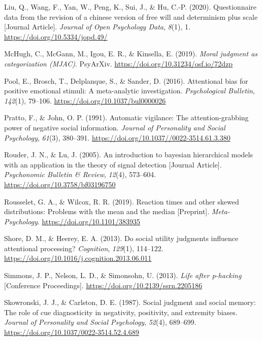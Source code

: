 \documentclass[
  man]{apa6}
\newlength{\cslhangindent}
\newlength{\cslentryspacingunit} %
\newenvironment{CSLReferences}[2] %
 {%
  \setlength{\parindent}{0pt}
  \ifodd #1
  \let\oldpar\par
  \def\par{\hangindent=\cslhangindent\oldpar}
  \fi
  \setlength{\parskip}{#2\cslentryspacingunit}
 }%
 {}
\begin{document}
\begin{CSLReferences}{1}{0}
\leavevmode{}%
Liu, Q., Wang, F., Yan, W., Peng, K., Sui, J., \& Hu, C.-P. (2020). Questionnaire data from the revision of a chinese version of free will and determinism plus scale {[}Journal Article{]}. \emph{Journal of Open Psychology Data}, \emph{8}(1), 1. \url{https://doi.org/10.5334/jopd.49/}

\leavevmode{}%
McHugh, C., McGann, M., Igou, E. R., \& Kinsella, E. (2019). \emph{Moral judgment as categorization ({MJAC})}. {PsyArXiv}. \url{https://doi.org/10.31234/osf.io/72dzp}

\leavevmode{}%
Pool, E., Brosch, T., Delplanque, S., \& Sander, D. (2016). Attentional bias for positive emotional stimuli: A meta-analytic investigation. \emph{Psychological Bulletin}, \emph{142}(1), 79--106. \url{https://doi.org/10.1037/bul0000026}

\leavevmode{}%
Pratto, F., \& John, O. P. (1991). Automatic vigilance: The attention-grabbing power of negative social information. \emph{Journal of Personality and Social Psychology}, \emph{61}(3), 380--391. \url{https://doi.org/10.1037//0022-3514.61.3.380}

\leavevmode{}%
Rouder, J. N., \& Lu, J. (2005). An introduction to bayesian hierarchical models with an application in the theory of signal detection {[}Journal Article{]}. \emph{Psychonomic Bulletin \& Review}, \emph{12}(4), 573--604. \url{https://doi.org/10.3758/bf03196750}

\leavevmode{}%
Rousselet, G. A., \& Wilcox, R. R. (2019). Reaction times and other skewed distributions: Problems with the mean and the median {[}Preprint{]}. \emph{Meta-Psychology}. \url{https://doi.org/10.1101/383935}

\leavevmode{}%
Shore, D. M., \& Heerey, E. A. (2013). Do social utility judgments influence attentional processing? \emph{Cognition}, \emph{129}(1), 114--122. \url{https://doi.org/10.1016/j.cognition.2013.06.011}

\leavevmode{}%
Simmons, J. P., Nelson, L. D., \& Simonsohn, U. (2013). \emph{Life after p-hacking} {[}Conference Proceedings{]}. \url{https://doi.org/10.2139/ssrn.2205186}

\leavevmode{}%
Skowronski, J. J., \& Carlston, D. E. (1987). Social judgment and social memory: The role of cue diagnosticity in negativity, positivity, and extremity biases. \emph{Journal of Personality and Social Psychology}, \emph{52}(4), 689--699. \url{https://doi.org/10.1037/0022-3514.52.4.689}


\end{CSLReferences}
\end{document}

